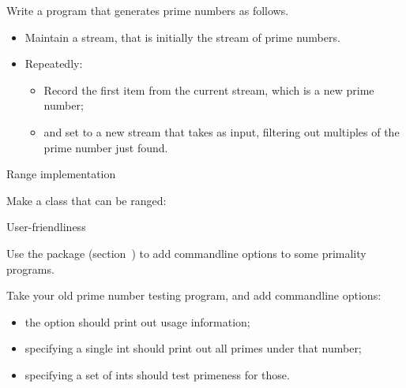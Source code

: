 \begin{exercise}
  Write a program that generates prime numbers as follows.
  \begin{itemize}
  \item Maintain a  stream, that is initially the stream of
    prime numbers.
  \item Repeatedly:
    \begin{itemize}
    \item Record the first item from the current stream, which is a
      new prime number;
    \item and set  to a new stream that takes 
      as input, filtering out multiples of the prime number just found.
    \end{itemize}
  \end{itemize}
\end{exercise}

 {Range implementation}


\begin{exercise}
  \label{ex:primerange}
  Make a  class that can be ranged:
\end{exercise}

 {User-friendliness}

Use the  package (section~)
to add commandline options to some primality programs.

\begin{exercise}
  \label{ex:prime-opts}
  Take your old prime number testing program, and add commandline options:
  \begin{itemize}
  \item the  option should print out usage information;
  \item specifying a single int  should print out all
    primes under that number;
  \item specifying a set of ints  should test
    primeness for those.
  \end{itemize}
\end{exercise}

\endinput

